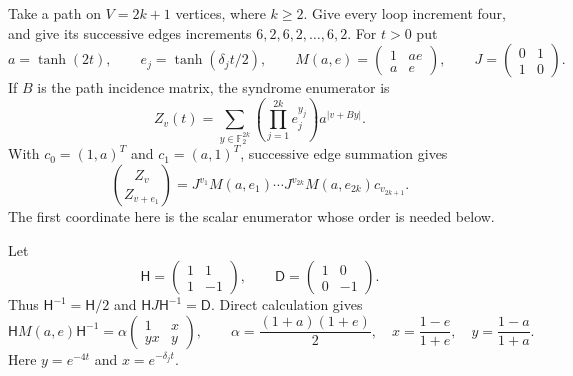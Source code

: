 Take a path on $V=2k+1$ vertices, where $k\ge2$. Give every loop
increment four, and give its successive edges increments
$6,2,6,2,\ldots,6,2$. For $t>0$ put
\[
 a=\tanh(2t),\qquad e_j=\tanh(\delta_jt/2),\qquad
 M(a,e)=\begin{pmatrix}1&ae\\a&e\end{pmatrix},\qquad
 J=\begin{pmatrix}0&1\\1&0\end{pmatrix}.
\]
If $B$ is the path incidence matrix, the syndrome enumerator is
\[
 Z_v(t)=\sum_{y\in\mathbb F_2^{2k}}
             \left(\prod_{j=1}^{2k}e_j^{y_j}\right)a^{|v+By|}.
\]
With $c_0=(1,a)^T$ and $c_1=(a,1)^T$, successive edge summation gives
\begin{equation}\label{eq:path-transfer-pair}
 \binom{Z_v}{Z_{v+e_1}}
 =J^{v_1}M(a,e_1)\cdots J^{v_{2k}}M(a,e_{2k})c_{v_{2k+1}}.
\end{equation}
The first coordinate here is the scalar enumerator whose order is
needed below.

Let
\[
 \mathsf H=\begin{pmatrix}1&1\\1&-1\end{pmatrix},\qquad
 \mathsf D=\begin{pmatrix}1&0\\0&-1\end{pmatrix}.
\]
Thus $\mathsf H^{-1}=\mathsf H/2$ and
$\mathsf HJ\mathsf H^{-1}=\mathsf D$. Direct calculation gives
\begin{equation}\label{eq:path-hadamard}
 \mathsf HM(a,e)\mathsf H^{-1}
 =\alpha\begin{pmatrix}1&x\\yx&y\end{pmatrix},\qquad
 \alpha=\frac{(1+a)(1+e)}2,\quad
 x=\frac{1-e}{1+e},\quad y=\frac{1-a}{1+a}.
\end{equation}
Here $y=e^{-4t}$ and $x=e^{-\delta_jt}$.

